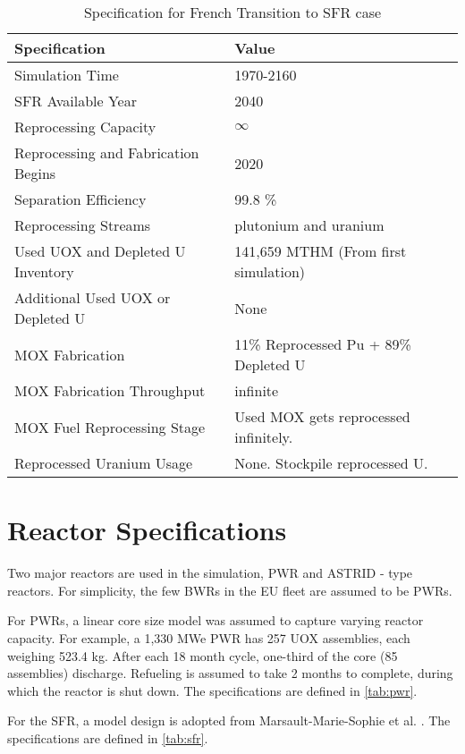\begin{table}[h]
	\centering
	\begin{tabularx}{\textwidth}{bb}
		\hline
		Specification & Value \\
		\hline
		Simulation Time & 1970-2160 \\
		\gls{SFR} Available Year & 2040 \\
		Reprocessing Capacity & $\infty$ \\
		Reprocessing and Fabrication Begins & 2020 \\
		Separation Efficiency & 99.8 \% \\
		Reprocessing Streams & plutonium and uranium \\
		\small{Used \gls{UOX} and Depleted U Inventory} & 141,659 MTHM {\small (From first simulation)} \\
		\small{Additional Used \gls{UOX} or Depleted U} & None  \\
		\gls{MOX} Fabrication &  \small{11\% Reprocessed Pu + 89\% Depleted U}  \\
		\gls{MOX} Fabrication Throughput & infinite \\
		\gls{MOX} Fuel Reprocessing Stage &  Used \gls{MOX} gets reprocessed infinitely. \\
		Reprocessed Uranium Usage &  None. Stockpile reprocessed U. \\
		\hline
	\end{tabularx}
	\caption {Specification for French Transition to \gls{SFR} case }
	\label{tab:sim_france}
\end{table}


\section{Reactor Specifications}
Two major reactors are used in the simulation, \gls{PWR} and ASTRID - type reactors.
For simplicity, the few \glspl{BWR} in the \gls{EU} fleet are assumed to be \glspl{PWR}.

For \glspl{PWR}, a linear core size model was assumed to capture
varying reactor capacity. For example, a 
1,330 MWe PWR has 257 \gls{UOX} assemblies, each
weighing 523.4 kg.
After each 18 month cycle, one-third of the 
core (85 assemblies) discharge. Refueling
is assumed to take 2 months to complete, during which the reactor
is shut down. The specifications are defined in \cref{tab:pwr}.

For the \gls{SFR}, a model design is adopted from
Marsault-Marie-Sophie et al. \cite{marsaultmarie-sophie_pre-conceptual_2012}.
The specifications are defined in \cref{tab:sfr}.

